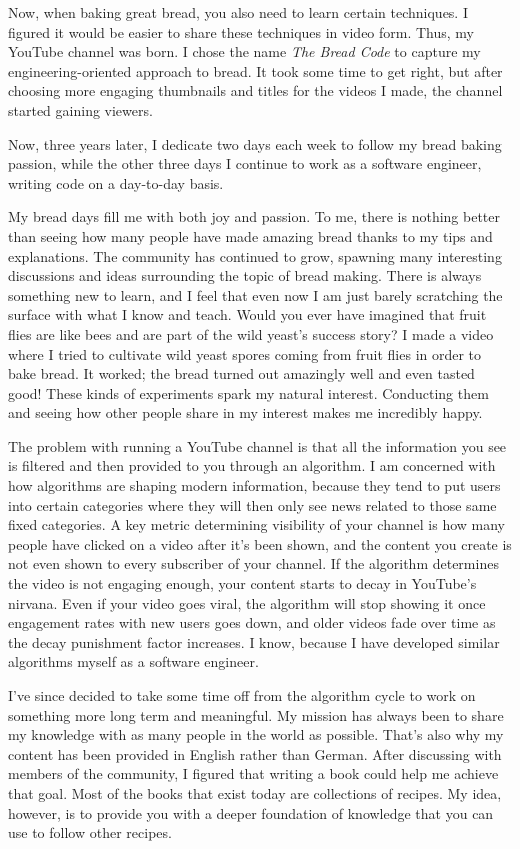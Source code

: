 Now, when baking great bread, you also need to learn certain techniques. I figured it would be
easier to share these techniques in video form. Thus, my YouTube channel was born. I chose
the name {\it The Bread Code} to capture my engineering-oriented approach to bread. It took some
time to get right, but after choosing more engaging thumbnails and titles for
the videos I made, the channel started gaining viewers.

Now, three years later, I dedicate two days each week to follow my bread baking passion, while
the other three days I continue to work as a software engineer, writing code on a day-to-day
basis.

My bread days fill me with both joy and passion. To me, there is nothing better than seeing
how many people have made amazing bread thanks to my tips and explanations. The community has
continued to grow, spawning many interesting discussions and ideas surrounding the topic of
bread making. There is always something new to learn, and I feel that even now I am just barely
scratching the surface with what I know and teach. Would you ever have imagined that fruit
flies are like bees and are part of the wild yeast's success story? I made a video where
I tried to cultivate wild yeast spores coming from fruit flies in order
to bake bread. It worked; the bread turned out amazingly well and even tasted good! These kinds of
experiments spark my natural interest. Conducting them and seeing how other people share in my
interest makes me incredibly happy.

The problem with running a YouTube channel is that all the information
you see is filtered and then provided to you through an algorithm. I am concerned
with how algorithms are shaping modern information, because they tend to
put users into certain categories where they will then only see news related to
those same fixed categories. A key metric determining visibility of your channel is how many
people have clicked on a video after it's been shown, and the content you create
is not even shown to every subscriber of your channel. If the algorithm determines the video
is not engaging enough, your content starts to decay in YouTube's nirvana. Even if your video
goes viral, the algorithm will stop showing it once engagement rates with new users goes down,
and older videos fade over time as the decay punishment factor increases. I know, because
I have developed similar algorithms myself as a software engineer.

I've since decided to take some time off from the algorithm cycle to work on something more
long term and meaningful. My mission has always been to share my knowledge with as many people
in the world as possible. That's also why my content has been provided in English rather than
German. After discussing with members of the community, I figured that writing a book could
help me achieve that goal. Most of the books that exist today are collections of recipes. My
idea, however, is to provide you with a deeper foundation of knowledge that you can use to
follow other recipes.

